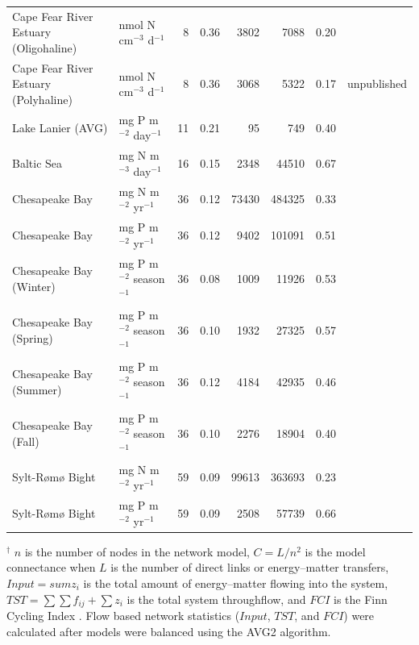 \documentclass[11pt]{article}
\begin{document}
\begin{table}[ht]
\begin{center}
\begin{tiny}
\begin{tabular}{llrrrrrr}
      Cape Fear River Estuary (Oligohaline) & nmol N cm$^{-3}$ d$^{-1}$ &   8 & 0.36 & 3802 & 7088 & 0.20 & \citet{hines12} \\ 
      Cape Fear River Estuary (Polyhaline) & nmol N cm$^{-3}$ d$^{-1}$ &   8 & 0.36 & 3068 & 5322 & 0.17 & unpublished \\ 
      Lake Lanier (AVG) & mg P m$^{-2}$ day$^{-1}$ &  11 & 0.21 &  95 & 749 & 0.40 & \citet{borrett07_lanier} \\ 
      Baltic Sea & mg N m$^{-3}$ day$^{-1}$  &  16 & 0.15 & 2348 & 44510 & 0.67 & \citet{hinrichsen98_baltic} \\ 
      Chesapeake Bay & mg N m$^{-2}$ yr$^{-1}$  &  36 & 0.12 & 73430 & 484325 & 0.33 & \citet{baird95} \\ 
      Chesapeake Bay & mg P m$^{-2}$ yr$^{-1}$ &  36 & 0.12 & 9402 & 101091 & 0.51 & \citet{ulanowicz99} \\ 
      Chesapeake Bay (Winter) & mg P m$^{-2}$ season$^{-1}$ &  36 & 0.08 & 1009 & 11926 & 0.53 & \citet{ulanowicz99} \\ 
      Chesapeake Bay (Spring) & mg P m$^{-2}$ season$^{-1}$ &  36 & 0.10 & 1932 & 27325 & 0.57 & \citet{ulanowicz99} \\ 
      Chesapeake Bay (Summer) & mg P m$^{-2}$ season$^{-1}$ &  36 & 0.12 & 4184 & 42935 & 0.46 & \citet{ulanowicz99} \\ 
      Chesapeake Bay (Fall) & mg P m$^{-2}$ season$^{-1}$ &  36 & 0.10 & 2276 & 18904 & 0.40 & \citet{ulanowicz99} \\ 
      Sylt-R{\o}m{\o} Bight & mg N m$^{-2}$ yr$^{-1}$  &  59 & 0.09 & 99613 & 363693 & 0.23 & \citet{baird08_sylt} \\ 
      Sylt-R{\o}m{\o} Bight & mg P m$^{-2}$ yr$^{-1}$  &  59 & 0.09 & 2508 & 57739 & 0.66 & \citet{baird08_sylt} \\ 
      \hline
    \end{tabular}
  \end{tiny}
\end{center}
\begin{scriptsize}
  $^\dagger$ $n$ is the number of nodes in the network model,
  $C=L/n^2$ is the model connectance when $L$ is the number of direct
  links or energy--matter transfers, $Input =sum{z_i}$ is the total
  amount of energy--matter flowing into the system,
  $TST=\sum\sum{f_{ij}}+\sum{z_i}$ is the total system throughflow,
  and $FCI$ is the Finn Cycling Index \citep{finn80}. Flow based
  network statistics ($Input$, $TST$, and $FCI$) were calculated after
  models were balanced using the AVG2 algorithm.
\end{scriptsize}
\end{table}
\end{document}

